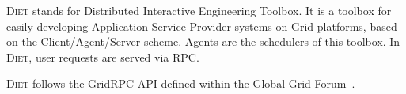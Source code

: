 \documentclass[12pt,a4paper]{book}
\begin{document}
\textsc{Diet} stands for Distributed Interactive Engineering
Toolbox. It is a toolbox for easily developing Application Service
Provider systems on Grid platforms, based on the Client/Agent/Server
scheme. Agents are the schedulers of this toolbox. In \textsc{Diet},
user requests are served via RPC.

\textsc{Diet} follows the GridRPC API defined within the Global Grid
Forum~\cite{GridRPC}.

%
%
\newpage


%
%
\newpage


%
%
\newpage


%
%
\newpage



%
\newpage


%
%
\newpage


%
%
\newpage



%
%
\newpage



%
%
\newpage


%
%
\newpage


%
%
\newpage


%
%
\newpage


%
%
\newpage


%
%
\newpage





\end{document}
